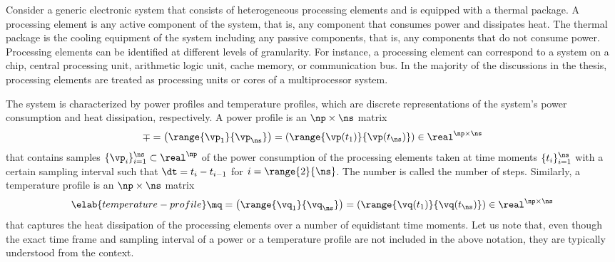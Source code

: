 Consider a generic electronic system that consists of \np heterogeneous
processing elements and is equipped with a thermal package. A processing element
is any active component of the system, that is, any component that consumes
power and dissipates heat. The thermal package is the cooling equipment of the
system including any passive components, that is, any components that do not
consume power. Processing elements can be identified at different levels of
granularity. For instance, a processing element can correspond to a system on a
chip, central processing unit, arithmetic logic unit, cache memory, or
communication bus. In the majority of the discussions in the thesis, processing
elements are treated as processing units or cores of a multiprocessor system.

The system is characterized by power profiles and temperature profiles, which
are discrete representations of the system's power consumption and heat
dissipation, respectively. A power profile is an $\np \times \ns$ matrix
\[
  \mp
  = \left(\range{\vp_1}{\vp_\ns}\right)
  = \left(\range{\vp(t_1)}{\vp(t_\ns)}\right) \in \real^{\np \times \ns}
\]
that contains \ns samples $\{ \vp_i \}_{i = 1}^\ns \subset \real^\np$ of the
power consumption of the \np processing elements taken at \ns time moments $\{
t_i \}_{i = 1}^\ns$ with a certain sampling interval \dt such that $\dt = t_i -
t_{i - 1}$ for $i = \range{2}{\ns}$. The number \ns is called the number of
steps. Similarly, a temperature profile is an $\np \times \ns$ matrix
\begin{equation} \elab{temperature-profile}
  \mq
  = \left(\range{\vq_1}{\vq_\ns}\right)
  = \left(\range{\vq(t_1)}{\vq(t_\ns)}\right) \in \real^{\np \times \ns}
\end{equation}
that captures the heat dissipation of the processing elements over a number of
equidistant time moments. Let us note that, even though the exact time frame and
sampling interval of a power or a temperature profile are not included in the
above notation, they are typically understood from the context.
